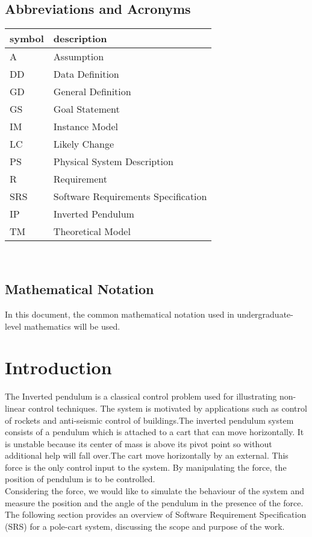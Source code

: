 \documentclass[12pt]{article}
\begin{document}
\subsection{Abbreviations and Acronyms}

\renewcommand{\arraystretch}{1.2}
\begin{tabular}{l l} 
  \toprule		
  \textbf{symbol} & \textbf{description}\\
  \midrule 
  A & Assumption\\
  DD & Data Definition\\
  GD & General Definition\\
  GS & Goal Statement\\
  IM & Instance Model\\
  LC & Likely Change\\
  PS & Physical System Description\\
  R & Requirement\\
  SRS & Software Requirements Specification\\
  IP & Inverted Pendulum\\
  TM & Theoretical Model\\
  \bottomrule
\end{tabular}\\

\subsection{Mathematical Notation}

{In this document, the common mathematical notation used in undergraduate-level mathematics will be used.}

\newpage


\section{Introduction}

The Inverted pendulum is a classical control problem used for illustrating non-linear control techniques. The system is motivated by applications such as control of rockets and anti-seismic control of buildings.The inverted pendulum system consists of a pendulum which is attached to a cart that can move horizontally. It is unstable because its center of mass is above its pivot point so without additional help will fall over.The cart move horizontally by an external. This force is the only control input to the system. By manipulating the force, the position of pendulum is to be controlled.\\
Considering the force, we would like to simulate the behaviour of the system and measure the position and the angle of the pendulum in the presence of the force.
The following section provides an overview of Software Requirement Specification (SRS) for a pole-cart system, discussing the scope and purpose of the work.
\end{document}
